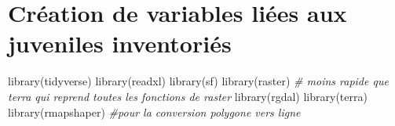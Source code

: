 \documentclass[
  12pt,
  american,
  a4paper,
  extrafontsizes,onecolumn,openright
  ]{memoir}
\newenvironment{Shaded}{\begin{snugshade}}{\end{snugshade}}
\newcommand{\CommentTok}[1]{\textcolor[rgb]{0.56,0.35,0.01}{\textit{#1}}}
\newcommand{\FunctionTok}[1]{\textcolor[rgb]{0.00,0.00,0.00}{#1}}
\newcommand{\NormalTok}[1]{#1}
\begin{document}
\hypertarget{cruxe9ation-de-variables-liuxe9es-aux-juveniles-inventoriuxe9s}{%
\chapter{Création de variables liées aux juveniles inventoriés}\label{cruxe9ation-de-variables-liuxe9es-aux-juveniles-inventoriuxe9s}}

\scriptsize

\begin{Shaded}
\begin{Highlighting}[]
\FunctionTok{library}\NormalTok{(tidyverse)}
\FunctionTok{library}\NormalTok{(readxl)}
\FunctionTok{library}\NormalTok{(sf)}
\FunctionTok{library}\NormalTok{(raster)  }\CommentTok{\# moins rapide que terra qui reprend toutes les fonctions de raster}
\FunctionTok{library}\NormalTok{(rgdal)}
\FunctionTok{library}\NormalTok{(terra)}
\FunctionTok{library}\NormalTok{(rmapshaper)  }\CommentTok{\#pour la conversion polygone vers ligne}
\end{Highlighting}
\end{Shaded}

\normalsize

\scriptsize
\end{document}
